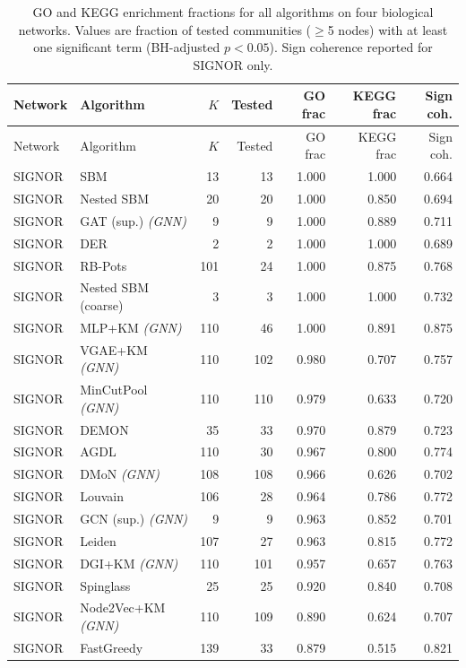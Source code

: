 \begin{longtable}{llrrrrr}
\caption{GO and KEGG enrichment fractions for all algorithms on four biological networks. Values are fraction of tested communities ($\geq$5 nodes) with at least one significant term (BH-adjusted $p < 0.05$). Sign coherence reported for SIGNOR only.}
\label{tab:bio_enrichment_full} \\
\toprule
Network & Algorithm & $K$ & Tested & GO frac & KEGG frac & Sign coh. \\
\midrule
\endfirsthead
\toprule
Network & Algorithm & $K$ & Tested & GO frac & KEGG frac & Sign coh. \\
\midrule
\endhead
SIGNOR & SBM & 13 & 13 & 1.000 & 1.000 & 0.664 \\
SIGNOR & Nested SBM & 20 & 20 & 1.000 & 0.850 & 0.694 \\
SIGNOR & GAT (sup.) \textit{(GNN)} & 9 & 9 & 1.000 & 0.889 & 0.711 \\
SIGNOR & DER & 2 & 2 & 1.000 & 1.000 & 0.689 \\
SIGNOR & RB-Pots & 101 & 24 & 1.000 & 0.875 & 0.768 \\
SIGNOR & Nested SBM (coarse) & 3 & 3 & 1.000 & 1.000 & 0.732 \\
SIGNOR & MLP+KM \textit{(GNN)} & 110 & 46 & 1.000 & 0.891 & 0.875 \\
SIGNOR & VGAE+KM \textit{(GNN)} & 110 & 102 & 0.980 & 0.707 & 0.757 \\
SIGNOR & MinCutPool \textit{(GNN)} & 110 & 110 & 0.979 & 0.633 & 0.720 \\
SIGNOR & DEMON & 35 & 33 & 0.970 & 0.879 & 0.723 \\
SIGNOR & AGDL & 110 & 30 & 0.967 & 0.800 & 0.774 \\
SIGNOR & DMoN \textit{(GNN)} & 108 & 108 & 0.966 & 0.626 & 0.702 \\
SIGNOR & Louvain & 106 & 28 & 0.964 & 0.786 & 0.772 \\
SIGNOR & GCN (sup.) \textit{(GNN)} & 9 & 9 & 0.963 & 0.852 & 0.701 \\
SIGNOR & Leiden & 107 & 27 & 0.963 & 0.815 & 0.772 \\
SIGNOR & DGI+KM \textit{(GNN)} & 110 & 101 & 0.957 & 0.657 & 0.763 \\
SIGNOR & Spinglass & 25 & 25 & 0.920 & 0.840 & 0.708 \\
SIGNOR & Node2Vec+KM \textit{(GNN)} & 110 & 109 & 0.890 & 0.624 & 0.707 \\
SIGNOR & FastGreedy & 139 & 33 & 0.879 & 0.515 & 0.821 \\

\end{longtable}
